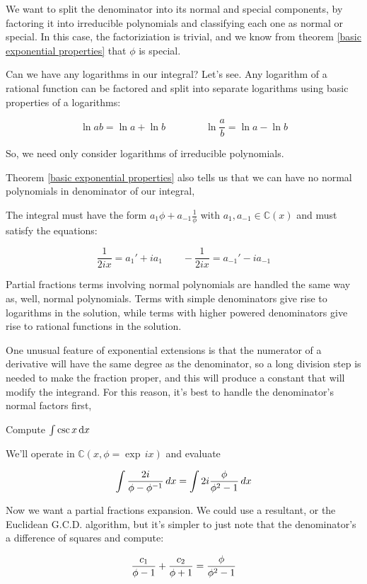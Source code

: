We want to split the denominator into its normal and special
components, by factoring it into irreducible polynomials and
classifying each one as normal or special.  In this case, the
factoriziation is trivial, and we know from theorem \ref{basic
exponential properties} that $\phi$ is special.

Can we have any logarithms in our integral?  Let's see.
Any logarithm of a rational function can be factored and
split into separate logarithms using basic properties
of a logarithms:

$$\ln ab = \ln a + \ln b \qquad\qquad \ln\frac{a}{b} = \ln a - \ln b$$

So, we need only consider logarithms of irreducible polynomials.

Theorem \ref{basic exponential properties} also tells us that we can
have no normal polynomials in denominator of our integral,


The integral must have the form $a_1 \phi + a_{-1} \frac{1}{\phi}$
with $a_1, a_{-1} \in {\mathbb C}(x)$ and must satisfy the equations:

$$\frac{1}{2ix} = a_1' + i a_1 \qquad - \frac{1}{2ix} = a_{-1}' - i a_{-1}$$

\endexample

\vfil\eject

Partial fractions terms involving normal polynomials are handled the
same way as, well, normal polynomials.  Terms with simple denominators
give rise to logarithms in the solution, while terms with higher
powered denominators give rise to rational functions in the solution.

One unusual feature of exponential extensions is that the numerator of
a derivative will have the same degree as the denominator, so a long
division step is needed to make the fraction proper, and this will
produce a constant that will modify the integrand.  For this reason,
it's best to handle the denominator's normal factors first,


\example Compute $\int \csc x \, {\rm d}x$

We'll operate in ${\mathbb C}(x, \phi = \exp \,ix)$ and evaluate

$$\int {{2i}\over{\phi - \phi^{-1}}} \,dx = \int 2i {{\phi}\over{\phi^2 - 1}} \,dx$$

Now we want a partial fractions expansion.  We could use a resultant,
or the Euclidean G.C.D. algorithm, but it's simpler to just note that
the denominator's a difference of squares and compute:

$${{c_1}\over{\phi-1}} + {{c_2}\over{\phi+1}} = {{\phi}\over{\phi^2-1}} $$

